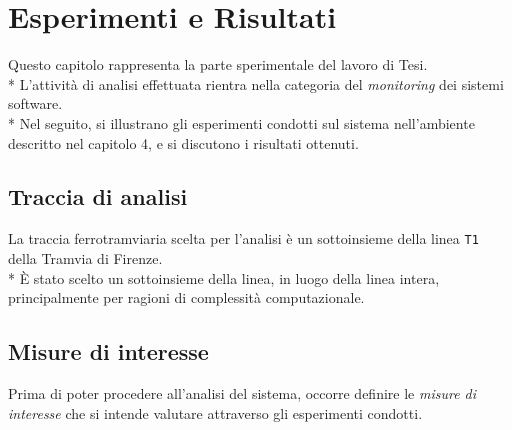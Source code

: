 \chapter{Esperimenti e Risultati}
Questo capitolo rappresenta la parte sperimentale del lavoro di Tesi.\\*
L'attivit\`a di analisi effettuata rientra nella categoria del \emph{monitoring} dei sistemi software.\\*
Nel seguito, si illustrano gli esperimenti condotti sul sistema nell'ambiente descritto nel capitolo 4, e si discutono i risultati ottenuti.
\section{Traccia di analisi}
La traccia ferrotramviaria scelta per l'analisi \`e un sottoinsieme della linea \texttt{T1} della Tramvia di Firenze.\\*
\`E stato scelto un sottoinsieme della linea, in luogo della linea intera, principalmente per ragioni di complessit\`a computazionale.
\section{Misure di interesse}
Prima di poter procedere all'analisi del sistema, occorre definire le \emph{misure di interesse} che si intende valutare attraverso gli esperimenti condotti.